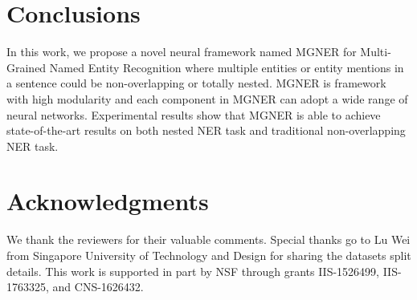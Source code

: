\documentclass[11pt,a4paper]{article}
\newcommand{\ModelName}{\textsc{MGNER}}
\newcommand{\multi}{Multi-Grained}
\begin{document}
\section{Conclusions}
\vspace{-2mm}
In this work, we propose a novel neural framework named {\ModelName} for {\multi} Named Entity Recognition where multiple entities or entity mentions in a sentence could be non-overlapping or totally nested. 
{\ModelName} is framework with high modularity and each component in {\ModelName} can adopt a wide range of neural networks. 
Experimental results show that {\ModelName} is able to achieve state-of-the-art results on both nested NER task and traditional non-overlapping NER task. \section*{Acknowledgments}
We thank the reviewers for their valuable comments.
Special thanks go to Lu Wei from Singapore University of Technology and Design for sharing the datasets split details.
This work is supported in part by NSF through grants IIS-1526499, IIS-1763325, and CNS-1626432. 

\balance

\end{document}
